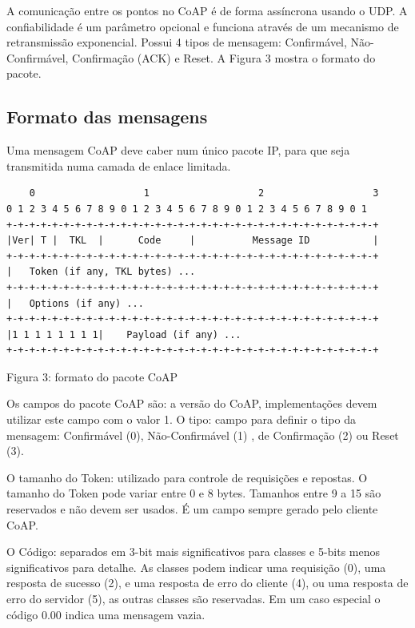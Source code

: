 A comunica\c{c}\~ao entre os pontos no CoAP \'e de forma ass\'incrona usando o UDP. A confiabilidade \'e um par\^ametro opcional e funciona atrav\'es de um mecanismo de retransmiss\~ao exponencial. Possui 4 tipos de mensagem: Confirm\'avel, N\~ao-Confirm\'avel, Confirma\c{c}\~ao (ACK) e Reset. A Figura 3 mostra o formato do pacote.

\subsection{Formato das mensagens}
Uma mensagem CoAP deve caber num \'unico pacote IP, para que seja transmitida numa camada de enlace limitada.
\begin{footnotesize}
    \begin{verbatim}
    0                   1                   2                   3
0 1 2 3 4 5 6 7 8 9 0 1 2 3 4 5 6 7 8 9 0 1 2 3 4 5 6 7 8 9 0 1
+-+-+-+-+-+-+-+-+-+-+-+-+-+-+-+-+-+-+-+-+-+-+-+-+-+-+-+-+-+-+-+-+
|Ver| T |  TKL  |      Code     |          Message ID           |
+-+-+-+-+-+-+-+-+-+-+-+-+-+-+-+-+-+-+-+-+-+-+-+-+-+-+-+-+-+-+-+-+
|   Token (if any, TKL bytes) ...
+-+-+-+-+-+-+-+-+-+-+-+-+-+-+-+-+-+-+-+-+-+-+-+-+-+-+-+-+-+-+-+-+
|   Options (if any) ...
+-+-+-+-+-+-+-+-+-+-+-+-+-+-+-+-+-+-+-+-+-+-+-+-+-+-+-+-+-+-+-+-+
|1 1 1 1 1 1 1 1|    Payload (if any) ...
+-+-+-+-+-+-+-+-+-+-+-+-+-+-+-+-+-+-+-+-+-+-+-+-+-+-+-+-+-+-+-+-+
    \end{verbatim}\end{footnotesize}
\begin{center}Figura 3: formato do pacote CoAP  \cite{draft-ietf-core-coap-18}\end{center}


Os campos do pacote CoAP s\~ao: a vers\~ao do CoAP, implementa\c{c}\~oes devem utilizar este campo com o valor 1. O tipo: campo para definir o tipo da mensagem: Confirm\'avel (0), N\~ao-Confirm\'avel (1) , de Confirma\c{c}\~ao (2) ou Reset (3).

O tamanho do Token: utilizado para controle de requisi\c{c}\~oes e repostas. O tamanho do Token pode variar entre 0 e 8 bytes. Tamanhos entre 9 a 15 s\~ao reservados e n\~ao devem ser usados. \'E um campo sempre gerado pelo cliente CoAP.

O C\'odigo: separados em 3-bit mais significativos para classes e 5-bits menos significativos para detalhe. As classes podem indicar uma requisi\c{c}\~ao (0), uma resposta de sucesso (2), e uma resposta de erro do cliente (4), ou uma resposta de erro do servidor (5), as outras classes s\~ao reservadas. Em um caso especial o c\'odigo 0.00 indica uma mensagem vazia.


